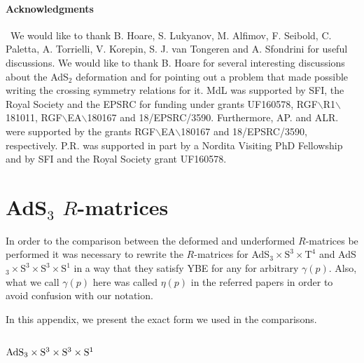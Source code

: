 \documentclass[12pt,a4paper]{article}
\numberwithin{equation}{section}
\begin{document}
\paragraph{Acknowledgments}

\
We would like to thank B. Hoare, S. Lukyanov, M. Alfimov, F. Seibold, C. Paletta, A. Torrielli, V. Korepin, S. J. van Tongeren and A. Sfondrini for useful discussions. We would like to thank B. Hoare for several interesting discussions about the AdS$ _2 $ deformation and for pointing out a problem that made possible writing the crossing symmetry relations for it.  
MdL was supported by SFI, the Royal Society and the EPSRC for funding under grants UF160578, RGF$\backslash$R1$\backslash$181011, RGF$\backslash$EA$\backslash$180167 and 18/EPSRC/3590. 
Furthermore, AP. and ALR. were supported by the grants 
 RGF$\backslash$EA$\backslash$180167 and 18/EPSRC/3590, respectively. 
P.R. was supported in part by a Nordita Visiting PhD Fellowship and by SFI and the Royal Society grant UF160578.
\


\appendix 

\section{AdS$ _{3} $ $R$-matrices}

In order to the comparison between the deformed and underformed $ R $-matrices be performed it was necessary to rewrite the $ R $-matrices for AdS$_3\times\text{S}^3\times \text{T}^4$  \cite{Sfondrini:2014via,Borsato:2014exa}  and AdS$ _3\times \text{S}^3\times \text{S}^3\times \text{S}^1 $\cite{Borsato:2015mma} in a way that they satisfy YBE for any for arbitrary $ \gamma(p) $. Also, what we call $ \gamma(p) $ here was called $ \eta(p) $ in the referred papers in order to avoid confusion with our notation.

In this appendix, we present the exact form we used in the comparisons. 

\subsection{${\rm AdS}_{3}\times {\rm S}^3\times {\rm S}^3\times {\rm S}^1$}\label{AdS3background2}
\end{document}
